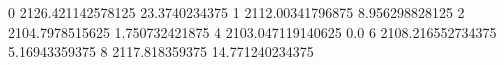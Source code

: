 0 2126.421142578125 23.3740234375
1 2112.00341796875 8.956298828125
2 2104.7978515625 1.750732421875
4 2103.047119140625 0.0
6 2108.216552734375 5.16943359375
8 2117.818359375 14.771240234375
